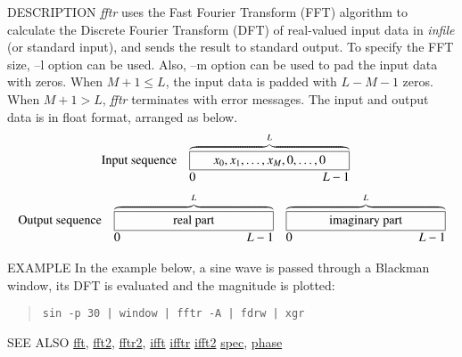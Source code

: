 \begin{synopsis}
 \item[fftr] [ --l $L$ ] [ --m $M$] [ --\{ A $|$ R $|$ I $|$ P \} ] [ --H ]
             [ {\em infile} ] 
\end{synopsis}

\begin{qsection}{DESCRIPTION}
{\em fftr} uses the Fast Fourier Transform (FFT) algorithm 
to calculate the Discrete Fourier Transform (DFT) 
of real-valued input data in {\em infile} (or standard input), 
and sends the result to standard output. 
To specify the FFT size, --l option can be used.
Also, --m option can be used to pad the input data with zeros.
When $M + 1 \leq L$,  the input data is padded
with $L - M - 1$ zeros. When $M + 1 > L$, {\em fftr} terminates
with error messages.
The input and output data is in float format, 
arranged as below.
\begin{displaymath}
\begin{array}{lll}
\mbox{Input sequence} & 
\overbrace{\framebox[4.5cm]{$x_0, x_1, \ldots, x_{M}, 0,
                                        \ldots,0$}}^{L}  & \\
                & \makebox[4.5cm]{0\hfill $L-1$} &
\end{array}
\end{displaymath}
\begin{displaymath}
\begin{array}{lll}
\mbox{Output sequence} & \overbrace{\framebox[4.5cm]{real part}}^{L} &
           \overbrace{\framebox[4.5cm]{imaginary part}}^{L} \\
                & \makebox[4.5cm]{0\hfill $L-1$} &
                \makebox[4.5cm]{0\hfill $L-1$}
\end{array}
\end{displaymath}
\end{qsection}

\begin{options}
\end{options}

\begin{qsection}{EXAMPLE}
In the example below, a sine wave is passed through a Blackman window,
its DFT is evaluated and the magnitude is plotted:
\begin{quote}
  \verb!sin -p 30 | window | fftr -A | fdrw | xgr!
\end{quote}

\end{qsection}

\begin{qsection}{SEE ALSO}
\hyperlink{fft}{fft},
\hyperlink{fft2}{fft2},
\hyperlink{fftr2}{fftr2},
\hyperlink{ifft}{ifft}
\hyperlink{ifftr}{ifftr}
\hyperlink{ifft2}{ifft2}
\hyperlink{spec}{spec},
\hyperlink{phase}{phase}
\end{qsection}
